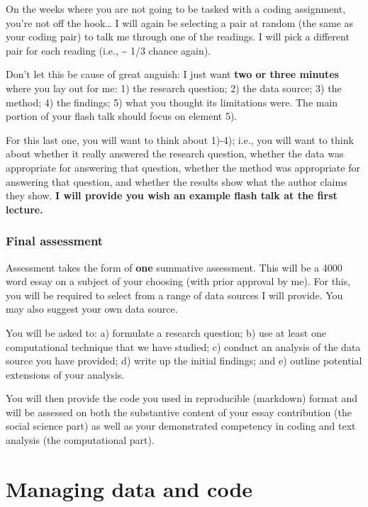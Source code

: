 \documentclass[
  letterpaper,
  DIV=11,
  numbers=noendperiod]{scrreprt}
\begin{document}
On the weeks where you are not going to be tasked with a coding
assignment, you're not off the hook\ldots{} I will again be selecting a
pair at random (the same as your coding pair) to talk me through one of
the readings. I will pick a different pair for each reading (i.e.,
\textasciitilde{} 1/3 chance again).

Don't let this be cause of great anguish: I just want \textbf{two or
three minutes} where you lay out for me: 1) the research question; 2)
the data source; 3) the method; 4) the findings; 5) what you thought its
limitations were. The main portion of your flash talk should focus on
element 5).

For this last one, you will want to think about 1)-4); i.e., you will
want to think about whether it really answered the research question,
whether the data was appropriate for answering that question, whether
the method was appropriate for answering that question, and whether the
results show what the author claims they show. \textbf{I will provide
you wish an example flash talk at the first lecture.}

\hypertarget{final-assessment}{%
\subsection*{Final assessment}\label{final-assessment}}

Assessment takes the form of \textbf{one} summative assessment. This
will be a 4000 word essay on a subject of your choosing (with prior
approval by me). For this, you will be required to select from a range
of data sources I will provide. You may also suggest your own data
source.

You will be asked to: a) formulate a research question; b) use at least
one computational technique that we have studied; c) conduct an analysis
of the data source you have provided; d) write up the initial findings;
and e) outline potential extensions of your analysis.

You will then provide the code you used in reproducible (markdown)
format and will be assessed on both the substantive content of your
essay contribution (the social science part) as well as your
demonstrated competency in coding and text analysis (the computational
part).


\hypertarget{managing-data-and-code}{%
\chapter*{Managing data and code}\label{managing-data-and-code}}
\end{document}
